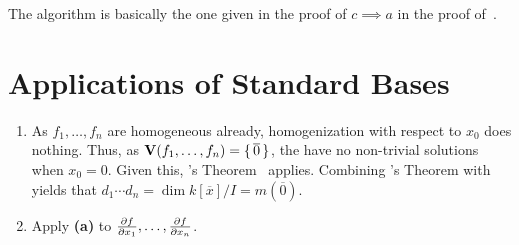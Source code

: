 \documentclass[letterpaper, 11pt, oneside]{book}
\begin{document}
\begin{sol}\label{ex:UAG_4.4.3}
\end{sol}

\begin{sol}\label{ex:UAG_4.4.4}
\end{sol}

\begin{sol}\label{ex:UAG_4.4.6}
  The algorithm is basically the one given in the proof of $c \implies a$ in the proof of~\cite[\S 4.4, Theorem 4.3]{book:UAG}.
\end{sol}

\clearpage

\section{Applications of Standard Bases}

\begin{sol}\label{ex:UAG_4.5.2}
  \begin{enumerate}
    \item As $f_{1}, \ldots, f_{n}$ are homogeneous already, homogenization with respect to $x_{0}$ does nothing.
          Thus, as $\operatorname{\mathbf{V}}(f_{1}, \ldots, f_{n}) = \set{\overline{0}}$, the have no non-trivial solutions when $x_{0} = 0$.
          Given this, \Bezout's Theorem~\cite[\S 3.5, Theorem 5.5]{book:UAG} applies.
          Combining \Bezout's Theorem with~\cite[\S 4.2, Theorem 2.5]{book:UAG} yields that $d_{1} \cdots d_{n} = \dim k[\overline{x}] / I = m(\overline{0})$.
    \item Apply \textbf{(a)} to $\ideal{\frac{\partial f}{\partial x_{1}}, \ldots, \frac{\partial f}{\partial x_{n}}}$.
  \end{enumerate}
\end{sol}

\begin{sol}\label{ex:UAG_4.5.3}
\end{sol}

\begin{sol}\label{ex:UAG_4.5.4}
\end{sol}
\end{document}

